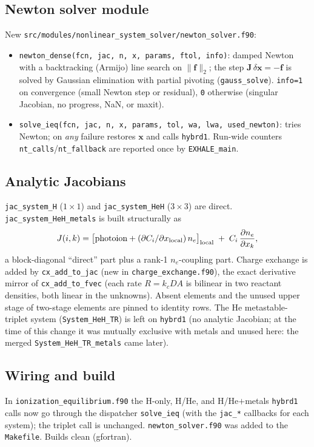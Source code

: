 \documentclass[english,a4paper]{my_memo}
\begin{document}
\subsection{Newton solver module}
New \texttt{src/modules/nonlinear\_system\_solver/newton\_solver.f90}:
\begin{itemize}
\item \texttt{newton\_dense(fcn, jac, n, x, params, ftol, info)}: damped Newton
  with a backtracking (Armijo) line search on $\lVert\mathbf f\rVert_2$; the step
  $\mathbf J\,\delta\mathbf x=-\mathbf f$ is solved by Gaussian elimination with
  partial pivoting (\texttt{gauss\_solve}). \texttt{info=1} on convergence (small
  Newton step or residual), \texttt{0} otherwise (singular Jacobian, no progress,
  NaN, or maxit).
\item \texttt{solve\_ieq(fcn, jac, n, x, params, tol, wa, lwa, used\_newton)}:
  tries Newton; on \emph{any} failure restores $\mathbf x$ and calls
  \texttt{hybrd1}. Run-wide counters \texttt{nt\_calls}/\texttt{nt\_fallback} are
  reported once by \texttt{EXHALE\_main}.
\end{itemize}

\subsection{Analytic Jacobians}
\texttt{jac\_system\_H} ($1\times1$) and \texttt{jac\_system\_HeH} ($3\times3$) are
direct. \texttt{jac\_system\_HeH\_metals} is built structurally as
\[
J(i,k) = \big[\text{photoion} + (\partial C_i/\partial x_{\rm local})\,n_e\big]_{\rm local}
         \;+\; C_i\,\frac{\partial n_e}{\partial x_k},
\]
a block-diagonal ``direct'' part plus a rank-1 $n_e$-coupling part. Charge exchange
is added by \texttt{cx\_add\_to\_jac} (new in \texttt{charge\_exchange.f90}), the
exact derivative mirror of \texttt{cx\_add\_to\_fvec} (each rate $R=k_c D A$ is
bilinear in two reactant densities, both linear in the unknowns). Absent elements
and the unused upper stage of two-stage elements are pinned to identity rows. The
He metastable-triplet system (\texttt{System\_HeH\_TR}) is left on \texttt{hybrd1}
(no analytic Jacobian; at the time of this change it was mutually exclusive with
metals and unused here: the merged \texttt{System\_HeH\_TR\_metals} came later).

\subsection{Wiring and build}
In \texttt{ionization\_\allowbreak equilibrium.f90} the H-only, H/He, and
H/He$+$metals \texttt{hybrd1} calls now go through the dispatcher
\texttt{solve\_ieq} (with the \texttt{jac\_*} callbacks for each system);
the triplet call is unchanged. \texttt{newton\_solver.f90} was added to the
\texttt{Makefile}. Builds clean (gfortran).
\end{document}
